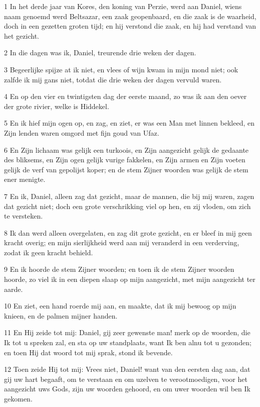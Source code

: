 \par 1 In het derde jaar van Kores, den koning van Perzie, werd aan Daniel, wiens naam genoemd werd Beltsazar, een zaak geopenbaard, en die zaak is de waarheid, doch in een gezetten groten tijd; en hij verstond die zaak, en hij had verstand van het gezicht.
\par 2 In die dagen was ik, Daniel, treurende drie weken der dagen.
\par 3 Begeerlijke spijze at ik niet, en vlees of wijn kwam in mijn mond niet; ook zalfde ik mij gans niet, totdat die drie weken der dagen vervuld waren.
\par 4 En op den vier en twintigsten dag der eerste maand, zo was ik aan den oever der grote rivier, welke is Hiddekel.
\par 5 En ik hief mijn ogen op, en zag, en ziet, er was een Man met linnen bekleed, en Zijn lenden waren omgord met fijn goud van Ufaz.
\par 6 En Zijn lichaam was gelijk een turkoois, en Zijn aangezicht gelijk de gedaante des bliksems, en Zijn ogen gelijk vurige fakkelen, en Zijn armen en Zijn voeten gelijk de verf van gepolijst koper; en de stem Zijner woorden was gelijk de stem ener menigte.
\par 7 En ik, Daniel, alleen zag dat gezicht, maar de mannen, die bij mij waren, zagen dat gezicht niet; doch een grote verschrikking viel op hen, en zij vloden, om zich te versteken.
\par 8 Ik dan werd alleen overgelaten, en zag dit grote gezicht, en er bleef in mij geen kracht overig; en mijn sierlijkheid werd aan mij veranderd in een verderving, zodat ik geen kracht behield.
\par 9 En ik hoorde de stem Zijner woorden; en toen ik de stem Zijner woorden hoorde, zo viel ik in een diepen slaap op mijn aangezicht, met mijn aangezicht ter aarde.
\par 10 En ziet, een hand roerde mij aan, en maakte, dat ik mij bewoog op mijn knieen, en de palmen mijner handen.
\par 11 En Hij zeide tot mij: Daniel, gij zeer gewenste man! merk op de woorden, die Ik tot u spreken zal, en sta op uw standplaats, want Ik ben alnu tot u gezonden; en toen Hij dat woord tot mij sprak, stond ik bevende.
\par 12 Toen zeide Hij tot mij: Vrees niet, Daniel! want van den eersten dag aan, dat gij uw hart begaaft, om te verstaan en om uzelven te verootmoedigen, voor het aangezicht uws Gods, zijn uw woorden gehoord, en om uwer woorden wil ben Ik gekomen.
